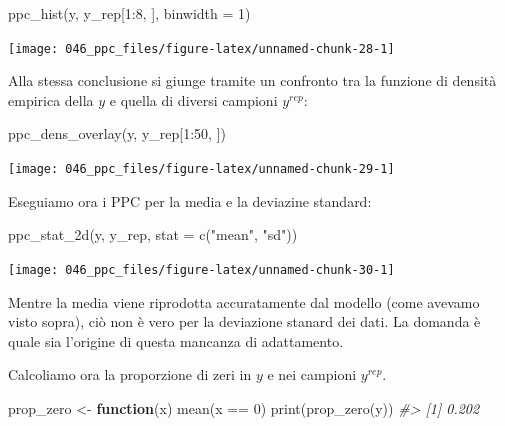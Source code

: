 \documentclass[
  11pt,
  italian,
  a4paper,
  extrafontsizes,onecolumn,openright
  ]{memoir}
\newenvironment{Shaded}{\begin{snugshade}}{\end{snugshade}}
\newcommand{\AttributeTok}[1]{\textcolor[rgb]{0.77,0.63,0.00}{#1}}
\newcommand{\CommentTok}[1]{\textcolor[rgb]{0.56,0.35,0.01}{\textit{#1}}}
\newcommand{\ControlFlowTok}[1]{\textcolor[rgb]{0.13,0.29,0.53}{\textbf{#1}}}
\newcommand{\DecValTok}[1]{\textcolor[rgb]{0.00,0.00,0.81}{#1}}
\newcommand{\FunctionTok}[1]{\textcolor[rgb]{0.00,0.00,0.00}{#1}}
\newcommand{\NormalTok}[1]{#1}
\newcommand{\OtherTok}[1]{\textcolor[rgb]{0.56,0.35,0.01}{#1}}
\newcommand{\SpecialCharTok}[1]{\textcolor[rgb]{0.00,0.00,0.00}{#1}}
\newcommand{\StringTok}[1]{\textcolor[rgb]{0.31,0.60,0.02}{#1}}
\theoremstyle{definition}
\theoremstyle{definition}
\theoremstyle{definition}
\theoremstyle{definition}
\theoremstyle{remark}
\begin{document}
\begin{Shaded}
\begin{Highlighting}[]
\FunctionTok{ppc\_hist}\NormalTok{(y, y\_rep[}\DecValTok{1}\SpecialCharTok{:}\DecValTok{8}\NormalTok{, ], }\AttributeTok{binwidth =} \DecValTok{1}\NormalTok{)}
\end{Highlighting}
\end{Shaded}

\begin{center}\texttt{[image: 046\_ppc\_files/figure-latex/unnamed-chunk-28-1]} \end{center}

Alla stessa conclusione si giunge tramite un confronto tra la funzione di densità empirica della \(y\) e quella di diversi campioni \(y^{rep}\):

\begin{Shaded}
\begin{Highlighting}[]
\FunctionTok{ppc\_dens\_overlay}\NormalTok{(y, y\_rep[}\DecValTok{1}\SpecialCharTok{:}\DecValTok{50}\NormalTok{, ])}
\end{Highlighting}
\end{Shaded}

\begin{center}\texttt{[image: 046\_ppc\_files/figure-latex/unnamed-chunk-29-1]} \end{center}

Eseguiamo ora i PPC per la media e la deviazine standard:

\begin{Shaded}
\begin{Highlighting}[]
\FunctionTok{ppc\_stat\_2d}\NormalTok{(y, y\_rep, }\AttributeTok{stat =} \FunctionTok{c}\NormalTok{(}\StringTok{"mean"}\NormalTok{, }\StringTok{"sd"}\NormalTok{))}
\end{Highlighting}
\end{Shaded}

\begin{center}\texttt{[image: 046\_ppc\_files/figure-latex/unnamed-chunk-30-1]} \end{center}

\noindent
Mentre la media viene riprodotta accuratamente dal modello (come avevamo visto sopra), ciò non è vero per la deviazione stanard dei dati. La domanda è quale sia l'origine di questa mancanza di adattamento.

Calcoliamo ora la proporzione di zeri in \(y\) e nei campioni \(y^{rep}\).

\begin{Shaded}
\begin{Highlighting}[]
\NormalTok{prop\_zero }\OtherTok{\textless{}{-}} \ControlFlowTok{function}\NormalTok{(x) }\FunctionTok{mean}\NormalTok{(x }\SpecialCharTok{==} \DecValTok{0}\NormalTok{)}
\FunctionTok{print}\NormalTok{(}\FunctionTok{prop\_zero}\NormalTok{(y))}
\CommentTok{\#\textgreater{} [1] 0.202}
\end{Highlighting}
\end{Shaded}
\end{document}
